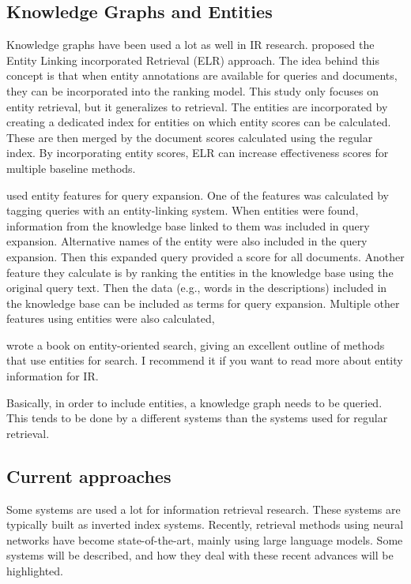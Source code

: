 \subsection{Knowledge Graphs and Entities}
Knowledge graphs have been used a lot as well in IR research.  proposed the Entity Linking incorporated Retrieval (ELR) approach. The idea behind this concept is that when entity annotations are available for queries and documents, they can be incorporated into the ranking model. This study only focuses on entity retrieval, but it generalizes to retrieval. The entities are incorporated by creating a dedicated index for entities on which entity scores can be calculated. These are then merged by the document scores calculated using the regular index. By incorporating entity scores, ELR can increase effectiveness scores for multiple baseline methods. 

 used entity features for query expansion. One of the features was calculated by tagging queries with an entity-linking system. When entities were found, information from the knowledge base linked to them was included in query expansion. Alternative names of the entity were also included in the query expansion. Then this expanded query provided a score for all documents. Another feature they calculate is by ranking the entities in the knowledge base using the original query text. Then the data (e.g., words in the descriptions) included in the knowledge base can be included as terms for query expansion. Multiple other features using entities were also calculated, 

 wrote a book on entity-oriented search, giving an excellent outline of methods that use entities for search. I recommend it if you want to read more about entity information for IR. 

Basically, in order to include entities, a knowledge graph needs to be queried. This tends to be done by a different systems than the systems used for regular retrieval.

\subsection{Current approaches}
Some systems are used a lot for information retrieval research. These systems are typically built as inverted index systems. Recently, retrieval methods using neural networks have become state-of-the-art, mainly using large language models. Some systems will be described, and how they deal with these recent advances will be highlighted.  

